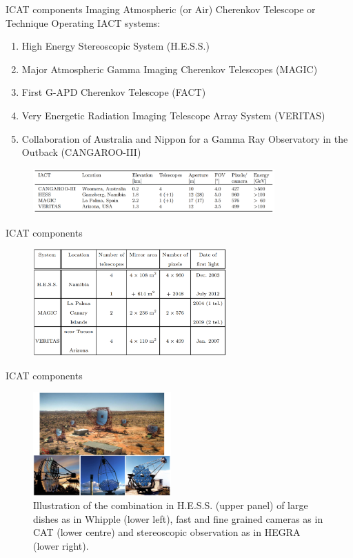 \documentclass{beamer}
\begin{document}
\begin{frame}{ICAT components}
	Imaging Atmospheric (or Air) Cherenkov Telescope or Technique
	\newline
	Operating IACT systems:
	\begin{enumerate}
		\item High Energy Stereoscopic System (H.E.S.S.)
		\item Major Atmospheric Gamma Imaging Cherenkov Telescopes (MAGIC)
		\item First G-APD Cherenkov Telescope (FACT)
		\item Very Energetic Radiation Imaging Telescope Array System (VERITAS)
		\item Collaboration of Australia and Nippon for a Gamma Ray Observatory in the Outback (CANGAROO-III)
	\end{enumerate}
	\begin{figure}[h]
		\includegraphics[width=350px]{IACT_tables.png}
	\end{figure}
\end{frame}

\begin{frame}{ICAT components}
	\begin{figure}[h]
		\includegraphics[width=280px]{ICATsystems.png}
	\end{figure}
\end{frame}


\begin{frame}{ICAT components}
	\begin{figure}[h]
		\includegraphics[width=200px]{dishes.png}
		\caption{Illustration of the combination in H.E.S.S. (upper panel) of large dishes as in Whipple (lower left), fast and fine grained cameras as in CAT (lower centre) and stereoscopic observation as in HEGRA (lower right).}
	\end{figure}
\end{frame}
\end{document}
